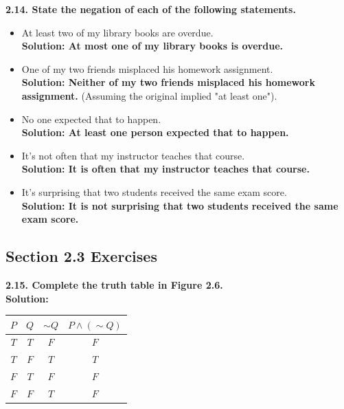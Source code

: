 \documentclass[11pt]{article}
\begin{document}
\vspace{0.5cm}
\textbf{2.14. State the negation of each of the following statements.}
\begin{itemize}
    \item[(a)] At least two of my library books are overdue. \\
    \textbf{Solution: At most one of my library books is overdue.}
    
    \item[(b)] One of my two friends misplaced his homework assignment. \\
    \textbf{Solution: Neither of my two friends misplaced his homework assignment.} (Assuming the original implied "at least one").
    
    \item[(c)] No one expected that to happen. \\
    \textbf{Solution: At least one person expected that to happen.}
    
    \item[(d)] It's not often that my instructor teaches that course. \\
    \textbf{Solution: It is often that my instructor teaches that course.}
    
    \item[(e)] It's surprising that two students received the same exam score. \\
    \textbf{Solution: It is not surprising that two students received the same exam score.}
\end{itemize}

\subsection{Section 2.3 Exercises}

\textbf{2.15. Complete the truth table in Figure 2.6.} \\
\textbf{Solution:}
\begin{center}
\begin{tabular}{|c|c|c|c|}
\hline
$P$ & $Q$ & $\sim Q$ & $P \land (\sim Q)$ \\
\hline
$T$ & $T$ & $F$ & $F$ \\
$T$ & $F$ & $T$ & $T$ \\
$F$ & $T$ & $F$ & $F$ \\
$F$ & $F$ & $T$ & $F$ \\
\hline
\end{tabular}
\end{center}
\end{document}
